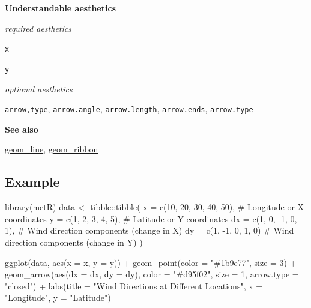 \documentclass[
  letterpaper,
  DIV=11,
  numbers=noendperiod]{scrreprt}
\newenvironment{Shaded}{\begin{snugshade}}{\end{snugshade}}
\newcommand{\AttributeTok}[1]{\textcolor[rgb]{0.40,0.45,0.13}{#1}}
\newcommand{\CommentTok}[1]{\textcolor[rgb]{0.37,0.37,0.37}{#1}}
\newcommand{\DecValTok}[1]{\textcolor[rgb]{0.68,0.00,0.00}{#1}}
\newcommand{\FunctionTok}[1]{\textcolor[rgb]{0.28,0.35,0.67}{#1}}
\newcommand{\NormalTok}[1]{\textcolor[rgb]{0.00,0.23,0.31}{#1}}
\newcommand{\OtherTok}[1]{\textcolor[rgb]{0.00,0.23,0.31}{#1}}
\newcommand{\SpecialCharTok}[1]{\textcolor[rgb]{0.37,0.37,0.37}{#1}}
\newcommand{\StringTok}[1]{\textcolor[rgb]{0.13,0.47,0.30}{#1}}
\begin{document}
\textbf{Understandable aesthetics}

\emph{required aesthetics}

\texttt{x}

\texttt{y}

\emph{optional aesthetics}

\texttt{arrow,type}, \texttt{arrow.angle}, \texttt{arrow.length},
\texttt{arrow.ends}, \texttt{arrow.type}

\textbf{See also}

\hyperref[line]{geom\_line}, \hyperref[ribbon]{geom\_ribbon}

\subsection{Example}\label{example}

\begin{Shaded}
\begin{Highlighting}[]
\FunctionTok{library}\NormalTok{(metR)}
\NormalTok{data }\OtherTok{\textless{}{-}}\NormalTok{ tibble}\SpecialCharTok{::}\FunctionTok{tibble}\NormalTok{(}
  \AttributeTok{x =} \FunctionTok{c}\NormalTok{(}\DecValTok{10}\NormalTok{, }\DecValTok{20}\NormalTok{, }\DecValTok{30}\NormalTok{, }\DecValTok{40}\NormalTok{, }\DecValTok{50}\NormalTok{),           }\CommentTok{\# Longitude or X{-}coordinates}
  \AttributeTok{y =} \FunctionTok{c}\NormalTok{(}\DecValTok{1}\NormalTok{, }\DecValTok{2}\NormalTok{, }\DecValTok{3}\NormalTok{, }\DecValTok{4}\NormalTok{, }\DecValTok{5}\NormalTok{),           }\CommentTok{\# Latitude or Y{-}coordinates}
  \AttributeTok{dx =} \FunctionTok{c}\NormalTok{(}\DecValTok{1}\NormalTok{, }\DecValTok{0}\NormalTok{, }\SpecialCharTok{{-}}\DecValTok{1}\NormalTok{, }\DecValTok{0}\NormalTok{, }\DecValTok{1}\NormalTok{),         }\CommentTok{\# Wind direction components (change in X)}
  \AttributeTok{dy =} \FunctionTok{c}\NormalTok{(}\DecValTok{1}\NormalTok{, }\SpecialCharTok{{-}}\DecValTok{1}\NormalTok{, }\DecValTok{0}\NormalTok{, }\DecValTok{1}\NormalTok{, }\DecValTok{0}\NormalTok{)          }\CommentTok{\# Wind direction components (change in Y)}
\NormalTok{)}

\FunctionTok{ggplot}\NormalTok{(data, }\FunctionTok{aes}\NormalTok{(}\AttributeTok{x =}\NormalTok{ x, }\AttributeTok{y =}\NormalTok{ y)) }\SpecialCharTok{+}
  \FunctionTok{geom\_point}\NormalTok{(}\AttributeTok{color =} \StringTok{"\#1b9e77"}\NormalTok{, }\AttributeTok{size =} \DecValTok{3}\NormalTok{) }\SpecialCharTok{+}  
  \FunctionTok{geom\_arrow}\NormalTok{(}\FunctionTok{aes}\NormalTok{(}\AttributeTok{dx =}\NormalTok{ dx, }\AttributeTok{dy =}\NormalTok{ dy), }\AttributeTok{color =} \StringTok{"\#d95f02"}\NormalTok{, }\AttributeTok{size =} \DecValTok{1}\NormalTok{, }\AttributeTok{arrow.type =} \StringTok{"closed"}\NormalTok{) }\SpecialCharTok{+}
  \FunctionTok{labs}\NormalTok{(}\AttributeTok{title =} \StringTok{"Wind Directions at Different Locations"}\NormalTok{, }\AttributeTok{x =} \StringTok{"Longitude"}\NormalTok{, }\AttributeTok{y =} \StringTok{"Latitude"}\NormalTok{)}
\end{Highlighting}
\end{Shaded}
\end{document}
